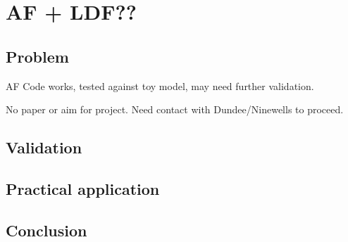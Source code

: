 \chapter{AF + LDF??}

\section{Problem}

AF Code works, tested against toy model, may need further validation. 

No paper or aim for project. Need contact with Dundee/Ninewells to proceed.

\section{Validation}
\section{Practical application}
\section{Conclusion}